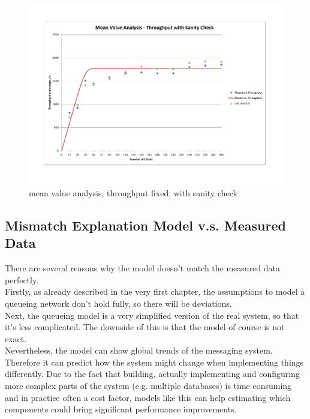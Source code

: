 \documentclass[a4paper]{article}
\begin{document}
{\begin{landscape}\begin{figure}[H]
	\begin{center}
    \includegraphics[scale=0.7, trim = 23mm 28mm 24mm 25mm, clip]{measurements_increase_load/tp_sanity_check_total_fixed.pdf}
  \end{center}
  \caption{mean value analysis, throughput fixed, with sanity check}
  \label{fig:tp-sanity-check-total-fixed}
\end{figure}
\end{landscape}


\subsection{Mismatch Explanation Model v.s. Measured Data}

There are several reasons why the model doesn't match the measured data perfectly.\\

Firstly, as already described in the very first chapter, the assumptions to model a queueing network don't hold fully, so there will be deviations.\\

Next, the queueing model is a very simplified version of the real system, so that it's less complicated. The downside of this is that the model of course is not exact.\\

Nevertheless, the model can show global trends of the messaging system. Therefore it can predict how the system might change when implementing things differently. Due to the fact that building, actually implementing and configuring more complex parts of the system (e.g. multiple databases) is time consuming and in practice often a cost factor, models like this can help estimating which components could bring significant performance improvements.\\


}
\end{document}
